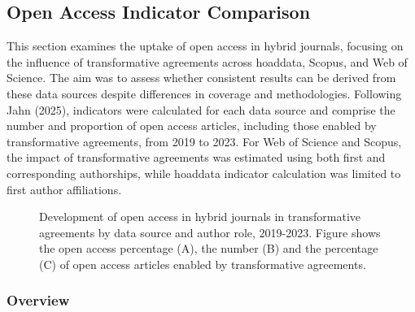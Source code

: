 \documentclass[a4paper,man,floatsintext,longtable,noextraspace,10pt]{apa6}
\begin{document}
\subsection{Open Access Indicator
Comparison}\label{open-access-indicator-comparison}

This section examines the uptake of open access in hybrid journals,
focusing on the influence of transformative agreements across hoaddata,
Scopus, and Web of Science. The aim was to assess whether consistent
results can be derived from these data sources despite differences in
coverage and methodologies. Following Jahn (2025), indicators were
calculated for each data source and comprise the number and proportion
of open access articles, including those enabled by transformative
agreements, from 2019 to 2023. For Web of Science and Scopus, the impact
of transformative agreements was estimated using both first and
corresponding authorships, while hoaddata indicator calculation was
limited to first author affiliations.

\begin{figure}[ht!]


\caption{\label{fig-uptake_overview}Development of open access in hybrid
journals in transformative agreements by data source and author role,
2019-2023. Figure shows the open access percentage (A), the number (B)
and the percentage (C) of open access articles enabled by transformative
agreements.}

\end{figure}%

\subsubsection{Overview}\label{overview-1}
\end{document}
